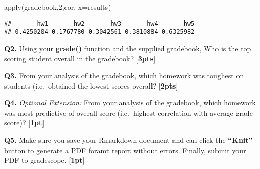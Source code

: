 \documentclass[
]{article}
\newenvironment{Shaded}{\begin{snugshade}}{\end{snugshade}}
\newcommand{\AttributeTok}[1]{\textcolor[rgb]{0.77,0.63,0.00}{#1}}
\newcommand{\DecValTok}[1]{\textcolor[rgb]{0.00,0.00,0.81}{#1}}
\newcommand{\FunctionTok}[1]{\textcolor[rgb]{0.00,0.00,0.00}{#1}}
\newcommand{\NormalTok}[1]{#1}
\begin{document}
\begin{Shaded}
\begin{Highlighting}[]
\FunctionTok{apply}\NormalTok{(gradebook,}\DecValTok{2}\NormalTok{,cor, }\AttributeTok{x=}\NormalTok{results)}
\end{Highlighting}
\end{Shaded}

\begin{verbatim}
##       hw1       hw2       hw3       hw4       hw5 
## 0.4250204 0.1767780 0.3042561 0.3810884 0.6325982
\end{verbatim}

\textbf{Q2.} Using your \textbf{grade()} function and the supplied
\href{https://tinyurl.com/gradeinput}{gradebook}, Who is the top scoring
student overall in the gradebook? {[}\textbf{3pts}{]}

\textbf{Q3.} From your analysis of the gradebook, which homework was
toughest on students (i.e.~obtained the lowest scores overall?
{[}\textbf{2pts}{]}

\textbf{Q4.} \emph{Optional Extension:} From your analysis of the
gradebook, which homework was most predictive of overall score
(i.e.~highest correlation with average grade score)? {[}\textbf{1pt}{]}

\textbf{Q5.} Make sure you save your Rmarkdown document and can click
the \textbf{``Knit''} button to generate a PDF foramt report without
errors. Finally, submit your PDF to gradescope. {[}\textbf{1pt}{]}
\end{document}
